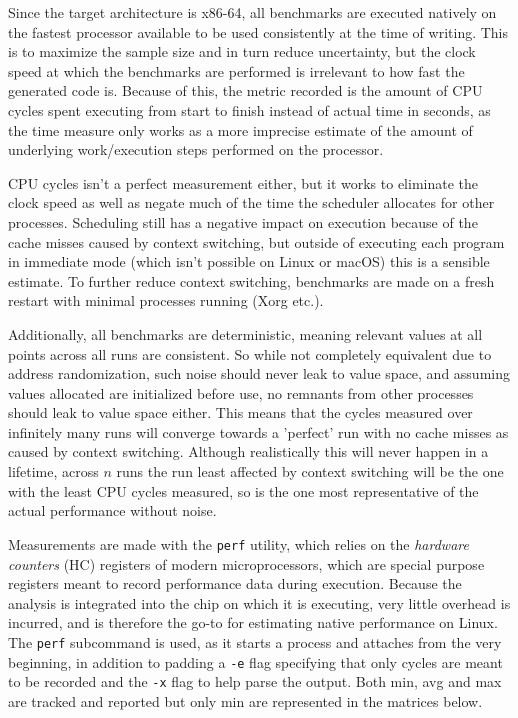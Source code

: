 \documentclass{article}
\begin{document}

Since the target architecture is x86-64, all benchmarks are executed natively on the fastest processor available to be used consistently at the time of writing. This is to maximize the sample size and in turn reduce uncertainty, but the clock speed at which the benchmarks are performed is irrelevant to how fast the generated code is. Because of this, the metric recorded is the amount of CPU cycles spent executing from start to finish instead of actual time in seconds, as the time measure only works as a more imprecise estimate of the amount of underlying work/execution steps performed on the processor.

CPU cycles isn't a perfect measurement either, but it works to eliminate the clock speed as well as negate much of the time the scheduler allocates for other processes. Scheduling still has a negative impact on execution because of the cache misses caused by context switching, but outside of executing each program in immediate mode (which isn't possible on Linux or macOS) this is a sensible estimate. To further reduce context switching, benchmarks are made on a fresh restart with minimal processes running (Xorg etc.).

Additionally, all benchmarks are deterministic, meaning relevant values at all points across all runs are consistent.
So while not completely equivalent due to address randomization, such noise should never leak to value space, and assuming values allocated are initialized before use, no remnants from other processes should leak to value space either.  %
This means that the cycles measured over infinitely many runs will converge towards a 'perfect' run with no cache misses as caused by context switching.
Although realistically this will never happen in a lifetime, across \(n\) runs the run least affected by context switching will be the one with the least CPU cycles measured, so is the one most representative of the actual performance without noise.

Measurements are made with the \lstinline!perf! utility, which relies on the \textit{hardware counters} (HC) registers of modern microprocessors, which are special purpose registers meant to record performance data during execution. Because the analysis is integrated into the chip on which it is executing, very little overhead is incurred, and is therefore the go-to for estimating native performance on Linux. The \lstinline!perf! subcommand is used, as it starts a process and attaches from the very beginning, in addition to padding a \lstinline!-e! flag specifying that only cycles are meant to be recorded and the \lstinline!-x! flag to help parse the output. Both min, avg and max are tracked and reported but only min are represented in the matrices below.
\end{document}
